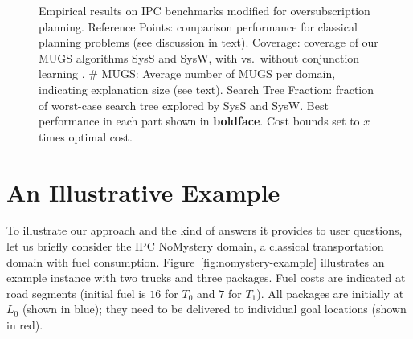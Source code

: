 
\setlength{\tabcolsep}{2pt}
\renewcommand{\arraystretch}{0.8}
\begin{figure*}[h!]
	\tiny
	\centering  
        \vspace{-0.2cm}
	\caption{Empirical results on IPC benchmarks modified for oversubscription planning. Reference Points: comparison performance for classical planning problems (see discussion in text). Coverage: coverage of our MUGS algorithms SysS and SysW, with vs.\ without conjunction learning \hc. \# MUGS: Average number of MUGS per domain, indicating explanation size (see text). Search Tree Fraction: fraction of worst-case search tree explored by SysS and SysW. Best performance in each part shown in \textbf{boldface}. Cost bounds set to $x$ times optimal cost.}
	\label{table:coverage_ipc}
        \vspace{-0.4cm}
\end{figure*}

\section{An Illustrative Example}
\label{illustrative-example}



To illustrate our approach and the kind of answers it provides to user
questions, let us briefly consider the IPC NoMystery domain, a
classical transportation domain with fuel
consumption. Figure~\ref{fig:nomystery-example} illustrates an example
instance with two trucks and three packages. Fuel costs are indicated
at road segments (initial fuel is $16$ for $T_0$ and $7$ for
$T_1$). All packages are initially at $L_0$ (shown in blue); they need
to be delivered to individual goal locations (shown in red).

